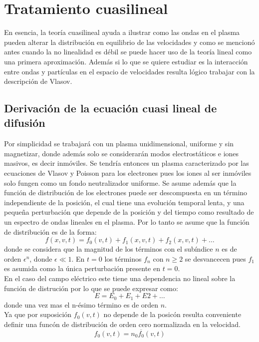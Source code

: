 \documentclass[../tesis_main_file.tex]{subfiles}
\begin{document}
\section{Tratamiento cuasilineal}
En esencia, la teoría cuasilineal ayuda a ilustrar  como las ondas en el plasma pueden alterar la distribución en equilibrio de las velocidades y como se mencionó antes cuando la no linealidad es débil se puede hacer uso de la teoría lineal como una primera aproximación. Además si lo que se quiere estudiar es la interacción entre ondas y partículas en el espacio de velocidades resulta lógico trabajar con la descripción de Vlasov.
\subsection{Derivación de la ecuación cuasi lineal de difusión}
Por simplicidad se trabajará con un plasma unidimensional, uniforme y sin magnetizar, donde además solo se considerarán modos electrostáticos e iones masivos, es decir inmóviles. Se tendría entonces un plasma caracterizado por las ecuaciones de Vlasov y Poisson para los electrones pues los iones al ser inmóviles solo fungen como un fondo neutralizador uniforme. Se asume además que la función de distribución de los electrones puede ser descompuesta en un término independiente de la posición, el cual tiene una evolución temporal lenta, y una pequeña perturbación que depende de la posición y del tiempo como resultado de un espectro de ondas lineales en el plasma. Por lo tanto se asume que la función de distribución es de la forma:
\begin{equation}
f(x,v,t)=f_0(v,t)+f_1(x,v,t)+f_2(x,v,t)+\dots
\end{equation}
donde se considera que la magnitud de los términos con el subíndice $n$ es de orden $\epsilon ^n$, donde $\epsilon \ll 1$. En $t=0$ los términos $f_n$ con $n \geq 2$ se desvancecen pues $f_1$ es asumida como la única perturbación presente en $t=0$.\\
En el caso del campo eléctrico este tiene una dependencia no lineal sobre la función de distrución por lo que se puede expresar como:
\begin{equation}
E=E_0+E_1+E2+\dots
\end{equation} 
donde una vez mas el n-ésimo término es de orden $n$.\\
Ya que por suposición $f_0(v,t)$ no depende de la posicón resulta conveniente definir una funcón de distribución de orden cero normalizada en la velocidad.
\begin{equation}
\label{eq:definicion_de_f0_normalizada}
f_0(v,t)=n_0\overline{f_0}(v,t)
\end{equation} 
\end{document}
